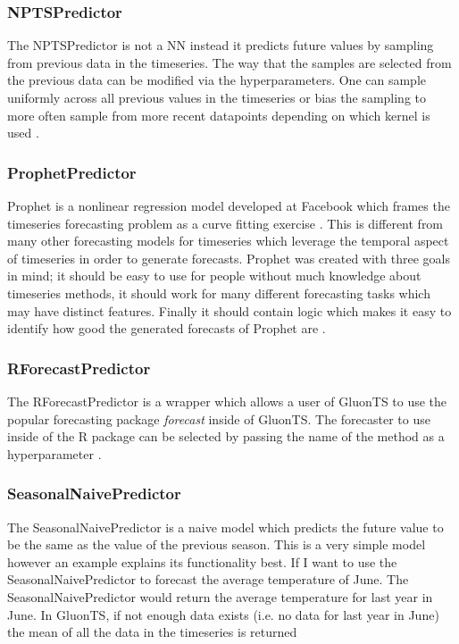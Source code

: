 \subsubsection{NPTSPredictor}
The NPTSPredictor is not a NN instead it predicts future values by sampling from previous data in the timeseries. The way that the samples are selected from the previous data can be modified via the hyperparameters. One can sample uniformly across all previous values in the timeseries or bias the sampling to more often sample from more recent datapoints depending on which kernel is used \cite{gluonts-website}.

\subsubsection{ProphetPredictor}
Prophet is a nonlinear regression model developed at Facebook which frames the timeseries forecasting problem as a curve fitting exercise \cite{hyndman_forecasting_3rd}. This is different from many other forecasting models for timeseries which leverage the temporal aspect of timeseries in order to generate forecasts. Prophet was created with three goals in mind; it should be easy to use for people without much knowledge about timeseries methods, it should work for many different forecasting tasks which may have distinct features. Finally it should contain logic which makes it easy to identify how good the generated forecasts of Prophet are \cite{taylor_forecasting_2017}.

\subsubsection{RForecastPredictor}
The RForecastPredictor is a wrapper which allows a user of GluonTS to use the popular forecasting package \textit{forecast} inside of GluonTS. The forecaster to use inside of the R package can be selected by passing the name of the method as a hyperparameter \cite{gluonts-website,r-forecast-package}.

\subsubsection{SeasonalNaivePredictor}
The SeasonalNaivePredictor is a naive model which predicts the future value to be the same as the value of the previous season. This is a very simple model however an example explains its functionality best. If I want to use the SeasonalNaivePredictor to forecast the average temperature of June. The SeasonalNaivePredictor would return the average temperature for last year in June. In GluonTS, if not enough data exists (i.e. no data for last year in June) the mean of all the data in the timeseries is returned \cite{gluonts-website,hyndman_forecasting_3rd}

